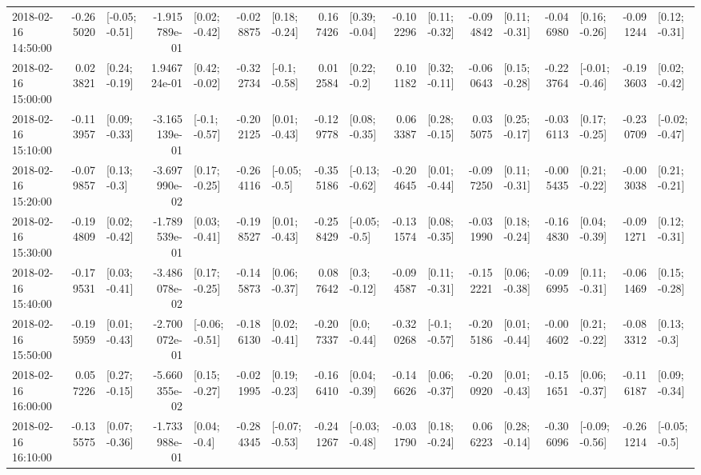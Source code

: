 \begin{tabular}{lrlrlrlrlrlrlrlrl}
2018-02-16 14:50:00 & -0.265020 &  [-0.05; -0.51] & -1.915789e-01 &   [0.02; -0.42] & -0.028875 &   [0.18; -0.24] &  0.167426 &   [0.39; -0.04] & -0.102296 &   [0.11; -0.32] & -0.094842 &   [0.11; -0.31] & -0.046980 &   [0.16; -0.26] & -0.091244 &   [0.12; -0.31] \\
2018-02-16 15:00:00 &  0.023821 &   [0.24; -0.19] &  1.946724e-01 &   [0.42; -0.02] & -0.322734 &   [-0.1; -0.58] &  0.012584 &    [0.22; -0.2] &  0.101182 &   [0.32; -0.11] & -0.060643 &   [0.15; -0.28] & -0.223764 &  [-0.01; -0.46] & -0.193603 &   [0.02; -0.42] \\
2018-02-16 15:10:00 & -0.113957 &   [0.09; -0.33] & -3.165139e-01 &   [-0.1; -0.57] & -0.202125 &   [0.01; -0.43] & -0.129778 &   [0.08; -0.35] &  0.063387 &   [0.28; -0.15] &  0.035075 &   [0.25; -0.17] & -0.036113 &   [0.17; -0.25] & -0.230709 &  [-0.02; -0.47] \\
2018-02-16 15:20:00 & -0.079857 &    [0.13; -0.3] & -3.697990e-02 &   [0.17; -0.25] & -0.264116 &   [-0.05; -0.5] & -0.355186 &  [-0.13; -0.62] & -0.204645 &   [0.01; -0.44] & -0.097250 &   [0.11; -0.31] & -0.005435 &   [0.21; -0.22] & -0.003038 &   [0.21; -0.21] \\
2018-02-16 15:30:00 & -0.194809 &   [0.02; -0.42] & -1.789539e-01 &   [0.03; -0.41] & -0.198527 &   [0.01; -0.43] & -0.258429 &   [-0.05; -0.5] & -0.131574 &   [0.08; -0.35] & -0.031990 &   [0.18; -0.24] & -0.164830 &   [0.04; -0.39] & -0.091271 &   [0.12; -0.31] \\
2018-02-16 15:40:00 & -0.179531 &   [0.03; -0.41] & -3.486078e-02 &   [0.17; -0.25] & -0.145873 &   [0.06; -0.37] &  0.087642 &    [0.3; -0.12] & -0.094587 &   [0.11; -0.31] & -0.152221 &   [0.06; -0.38] & -0.096995 &   [0.11; -0.31] & -0.061469 &   [0.15; -0.28] \\
2018-02-16 15:50:00 & -0.195959 &   [0.01; -0.43] & -2.700072e-01 &  [-0.06; -0.51] & -0.186130 &   [0.02; -0.41] & -0.207337 &    [0.0; -0.44] & -0.320268 &   [-0.1; -0.57] & -0.205186 &   [0.01; -0.44] & -0.004602 &   [0.21; -0.22] & -0.083312 &    [0.13; -0.3] \\
2018-02-16 16:00:00 &  0.057226 &   [0.27; -0.15] & -5.660355e-02 &   [0.15; -0.27] & -0.021995 &   [0.19; -0.23] & -0.166410 &   [0.04; -0.39] & -0.146626 &   [0.06; -0.37] & -0.200920 &   [0.01; -0.43] & -0.151651 &   [0.06; -0.37] & -0.116187 &   [0.09; -0.34] \\
2018-02-16 16:10:00 & -0.135575 &   [0.07; -0.36] & -1.733988e-01 &    [0.04; -0.4] & -0.284345 &  [-0.07; -0.53] & -0.241267 &  [-0.03; -0.48] & -0.031790 &   [0.18; -0.24] &  0.066223 &   [0.28; -0.14] & -0.306096 &  [-0.09; -0.56] & -0.261214 &   [-0.05; -0.5] \\

\end{tabular}
